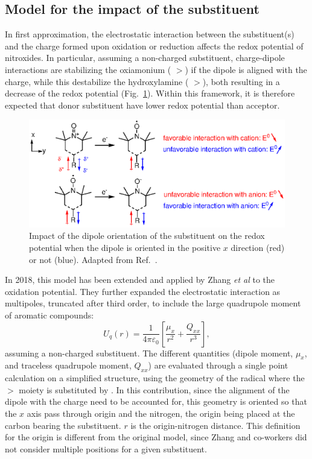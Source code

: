 \documentclass[review]{elsarticle}
\begin{document}
\subsection{Model for the impact of the substituent}

In first approximation, the electrostatic interaction between the substituent(s) and the charge formed upon oxidation or reduction affects the redox potential of nitroxides. In particular, assuming a non-charged substituent, charge-dipole interactions are stabilizing the oxiamonium ( $>$) if the dipole is aligned with the charge, while this destabilize the hydroxylamine ( $>$), both resulting in a decrease of the redox potential (Fig.~\ref{fig:dipole}). Within this framework, it is therefore expected that donor substituent have lower redox potential than acceptor.

\begin{figure}[!h]
	\centering
	\includegraphics[width=.7\linewidth]{Figure2}
	\caption{Impact of the dipole orientation of the substituent on the redox potential when the dipole is oriented in  the positive $x$ direction (red) or not (blue). Adapted from Ref.~.}
	\label{fig:dipole}
\end{figure}

In 2018, this model has been extended and applied by Zhang \textit{et al} \cite{zhangEffectHeteroatomFunctionality2018} to the oxidation potential. They further expanded the electrostatic interaction as  multipoles, truncated after third order, to include the large quadrupole moment of aromatic compounds:\begin{equation}
	U_q(r) =\frac{1}{4\pi\varepsilon_0} \left[\frac{\mu_x}{r^2} + \frac{Q_{xx}}{r^3}\right], \label{eq:Er}
\end{equation}
assuming a non-charged substituent. The different quantities (dipole moment, $\mu_x$, and traceless quadrupole moment, $Q_{xx}$) are evaluated through a single point calculation on a simplified structure, using the geometry of the radical where the $>$ moiety is substituted by .  In this contribution, since the alignment of the dipole with the charge need to be accounted for, this geometry is oriented so that the $x$ axis pass through origin and the nitrogen, the origin being placed at the carbon bearing the substituent. $r$ is the origin-nitrogen distance. This definition for the origin is different from the original model, since  Zhang and co-workers did not consider multiple positions for a given substituent. 
\end{document}
